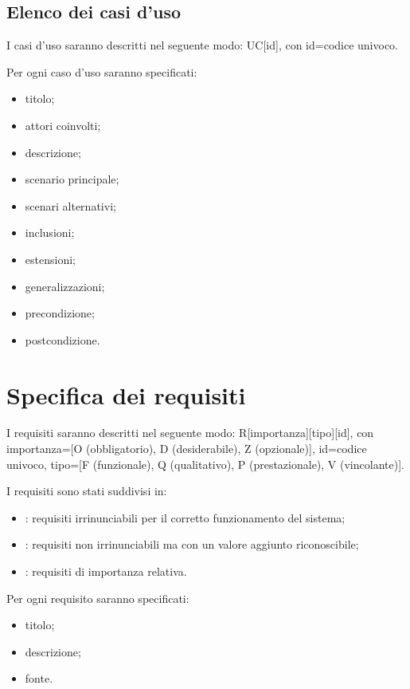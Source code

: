\documentclass[a4paper, titlepage]{article}
\begin{document}
\subsection{Elenco dei casi d'uso}
I casi d'uso saranno descritti nel seguente modo: UC[id], con id=codice univoco. 

Per ogni caso d'uso saranno specificati:
\begin{itemize}
\item titolo;
\item attori coinvolti;
\item descrizione;
\item scenario principale;
\item scenari alternativi;
\item inclusioni;
\item estensioni;
\item generalizzazioni;
\item precondizione;
\item postcondizione.
\end{itemize}

\setcounter{secnumdepth}{0}
\setcounter{tocdepth}{0}



\setcounter{secnumdepth}{5} 
\setcounter{tocdepth}{5} 

\section{Specifica dei requisiti}
I requisiti saranno descritti nel seguente modo: R[importanza][tipo][id], con importanza=[O (obbligatorio), D (desiderabile), Z (opzionale)], id=codice univoco, tipo=[F (funzionale), Q (qualitativo), P (prestazionale), V (vincolante)].

\bigskip

I requisiti sono stati suddivisi in:
\begin{itemize}
\item {}: requisiti irrinunciabili per il corretto funzionamento del sistema;
\item {}: requisiti non irrinunciabili ma con un valore aggiunto riconoscibile;
\item {}: requisiti di importanza relativa.
\end{itemize}

\bigskip

Per ogni requisito saranno specificati:
\begin{itemize}
\item titolo;
\item descrizione;
\item fonte.
\end{itemize}
\end{document}
